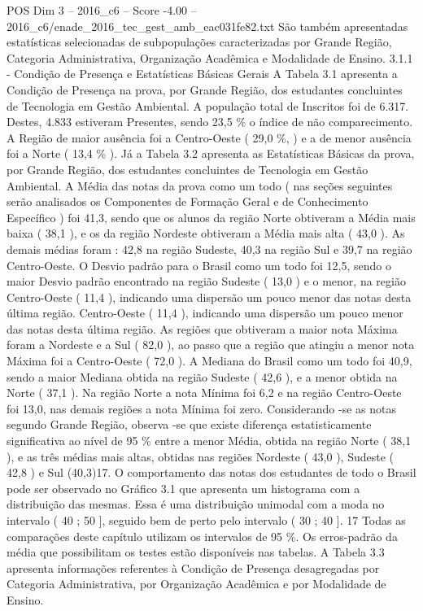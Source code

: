 \begin{textsample}{POS Dim 3 – 2016\_c6 – Score -4.00 – 2016\_c6/enade\_2016\_tec\_gest\_amb\_eac031fe82.txt}
São também apresentadas estatísticas selecionadas de subpopulações caracterizadas por Grande Região, Categoria Administrativa, Organização Acadêmica e Modalidade de Ensino. 3.1.1 - Condição de Presença e Estatísticas Básicas Gerais A Tabela 3.1 apresenta a Condição de Presença na prova, por Grande Região, dos estudantes concluintes de Tecnologia em Gestão Ambiental.
A população total de Inscritos foi de 6.317.
Destes, 4.833 estiveram Presentes, sendo 23,5 \% o índice de não comparecimento.
A Região de maior ausência foi a Centro-Oeste ( 29,0 \%, ) e a de menor ausência foi a Norte ( 13,4 \% ).
Já a Tabela 3.2 apresenta as Estatísticas Básicas da prova, por Grande Região, dos estudantes concluintes de Tecnologia em Gestão Ambiental.
A Média das notas da prova como um todo ( nas seções seguintes serão analisados os Componentes de Formação Geral e de Conhecimento Específico ) foi 41,3, sendo que os alunos da região Norte obtiveram a Média mais baixa ( 38,1 ), e os da região Nordeste obtiveram a Média mais alta ( 43,0 ).
As demais médias foram : 42,8 na região Sudeste, 40,3 na região Sul e 39,7 na região Centro-Oeste.
O Desvio padrão para o Brasil como um todo foi 12,5, sendo o maior Desvio padrão encontrado na região Sudeste ( 13,0 ) e o menor, na região Centro-Oeste ( 11,4 ), indicando uma dispersão um pouco menor das notas desta última região.
Centro-Oeste ( 11,4 ), indicando uma dispersão um pouco menor das notas desta última região.
As regiões que obtiveram a maior nota Máxima foram a Nordeste e a Sul ( 82,0 ), ao passo que a região que atingiu a menor nota Máxima foi a Centro-Oeste ( 72,0 ).
A Mediana do Brasil como um todo foi 40,9, sendo a maior Mediana obtida na região Sudeste ( 42,6 ), e a menor obtida na Norte ( 37,1 ).
Na região Norte a nota Mínima foi 6,2 e na região Centro-Oeste foi 13,0, nas demais regiões a nota Mínima foi zero.
Considerando -se as notas segundo Grande Região, observa -se que existe diferença estatisticamente significativa ao nível de 95 \% entre a menor Média, obtida na região Norte ( 38,1 ), e as três médias mais altas, obtidas nas regiões Nordeste ( 43,0 ), Sudeste ( 42,8 ) e Sul (40,3)17.
O comportamento das notas dos estudantes de todo o Brasil pode ser observado no Gráfico 3.1 que apresenta um histograma com a distribuição das mesmas.
Essa é uma distribuição unimodal com a moda no intervalo ( 40 ; 50 ], seguido bem de perto pelo intervalo ( 30 ; 40 ]. 17 Todas as comparações deste capítulo utilizam os intervalos de 95 \%.
Os erros-padrão da média que possibilitam os testes estão disponíveis nas tabelas.
A Tabela 3.3 apresenta informações referentes à Condição de Presença desagregadas por Categoria Administrativa, por Organização Acadêmica e por Modalidade de Ensino.

\end{textsample}
